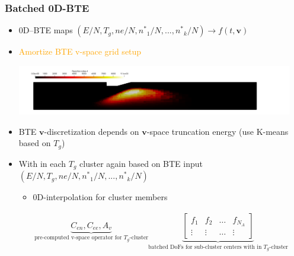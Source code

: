 \documentclass[mathserif, aspectratio=169]{beamer}
\newcommand{\overbar}[1]{\mkern 1.5mu\overline{\mkern-1.5mu#1\mkern-1.5mu}\mkern 1.5mu}
\newcommand{\vect}[1]{\boldsymbol{#1}}
\begin{document}
\begin{frame}
	\frametitle{Batched 0D-BTE}
	\begin{itemize}
		\item 0D--BTE maps $(E/N, T_g, ne/N, {n^{*}}_1/N, ... , {n^{*}}_k/N ) \rightarrow  f(t,\vect{v})$
		\item \textcolor{orange}{Amortize BTE v-space grid setup}
		\begin{center}
			\includegraphics[width=0.95\textwidth]{tps_clustering.png}
		\end{center}
		\item BTE $\vect{v}$-discretization depends on $\vect{v}$-space truncation energy (use K-means based on $T_g$)
		\item With in each $T_g$ cluster again based on BTE input $(E/N, T_g, ne/N, {n^{*}}_1/N, ... , {n^{*}}_k/N )$ 
		\begin{itemize}
			\item 0D-interpolation for cluster members
		\end{itemize}
		{\footnotesize
			\begin{align*}
				\underbrace{C_{en}, C_{ee}, A_{v}}_{\text{pre-computed v-space operator for $T_g$-cluster}} \underbrace{\begin{bmatrix}
						f_1    & f_2    & \hdots & f_{N_A} \\
						\vdots & \vdots & \hdots &\vdots
				\end{bmatrix}}_{\text{batched DoFs for sub-cluster centers with in $T_g$-cluster}}
		\end{align*}}
	\end{itemize}
\end{frame}
\end{document}
